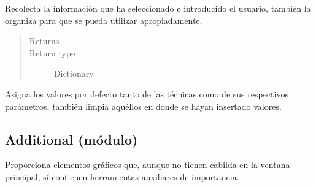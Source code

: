 \documentclass[letterpaper,10pt,english]{sphinxmanual}
\begin{document}
\begin{fulllineitems}
\begin{fulllineitems}
\end{fulllineitems}


\begin{fulllineitems}
\label{View/Main/MOEA/SharingFunctionFrame:View.Main.MOEA.SharingFunctionFrame.SharingFunctionFrame.get_information}
Recolecta la información que ha seleccionado e introducido el usuario,
también la organiza para que se pueda utilizar apropiadamente.
\begin{quote}\begin{description}
\item[{Returns}] \leavevmode



\item[{Return type}] \leavevmode
Dictionary

\end{description}\end{quote}

\end{fulllineitems}


\begin{fulllineitems}
\label{View/Main/MOEA/SharingFunctionFrame:View.Main.MOEA.SharingFunctionFrame.SharingFunctionFrame.restore_settings}
Asigna los valores por defecto tanto de las técnicas como de sus 
respectivos parámetros, también limpia aquéllos en donde se hayan 
insertado valores.

\end{fulllineitems}


\end{fulllineitems}



\subsection{Additional (módulo)}
\label{View/Additional/Additional:additional-modulo}\label{View/Additional/Additional::doc}
Proporciona elementos gráficos que, aunque no tienen cabilda en la
ventana principal, sí contienen herramientas auxiliares de importancia.
\end{document}
